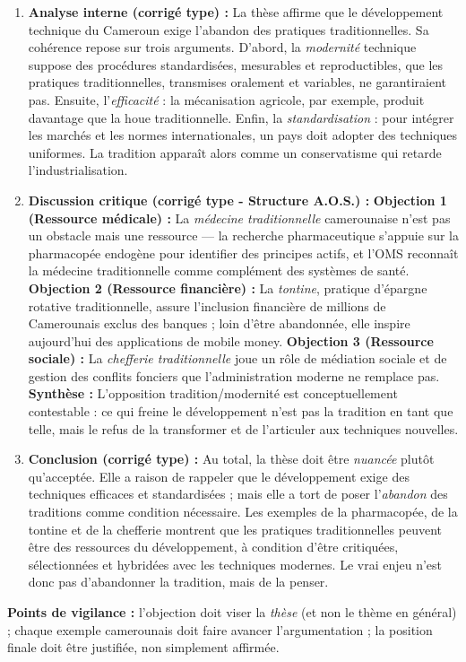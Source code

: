 \documentclass[11pt]{article}
\begin{document}
\begin{exoresolu}[Exercice 8 — Construire une discussion critique — Cas camerounais (Thèse : \og Développement technique = abandon traditions \fg)]
\begin{enumerate}
\item \textbf{Analyse interne (corrigé type) :} La thèse affirme que le développement technique du Cameroun exige l'abandon des pratiques traditionnelles. Sa cohérence repose sur trois arguments. D'abord, la \emph{modernité} technique suppose des procédures standardisées, mesurables et reproductibles, que les pratiques traditionnelles, transmises oralement et variables, ne garantiraient pas. Ensuite, l'\emph{efficacité} : la mécanisation agricole, par exemple, produit davantage que la houe traditionnelle. Enfin, la \emph{standardisation} : pour intégrer les marchés et les normes internationales, un pays doit adopter des techniques uniformes. La tradition apparaît alors comme un conservatisme qui retarde l'industrialisation.
\item \textbf{Discussion critique (corrigé type - Structure A.O.S.) :}
\textbf{Objection 1 (Ressource médicale) :} La \emph{médecine traditionnelle} camerounaise n'est pas un obstacle mais une ressource — la recherche pharmaceutique s'appuie sur la pharmacopée endogène pour identifier des principes actifs, et l'OMS reconnaît la médecine traditionnelle comme complément des systèmes de santé.
\textbf{Objection 2 (Ressource financière) :} La \emph{tontine}, pratique d'épargne rotative traditionnelle, assure l'inclusion financière de millions de Camerounais exclus des banques ; loin d'être abandonnée, elle inspire aujourd'hui des applications de mobile money.
\textbf{Objection 3 (Ressource sociale) :} La \emph{chefferie traditionnelle} joue un rôle de médiation sociale et de gestion des conflits fonciers que l'administration moderne ne remplace pas.
\textbf{Synthèse :} L'opposition tradition/modernité est conceptuellement contestable : ce qui freine le développement n'est pas la tradition en tant que telle, mais le refus de la transformer et de l'articuler aux techniques nouvelles.
\item \textbf{Conclusion (corrigé type) :} Au total, la thèse doit être \emph{nuancée} plutôt qu'acceptée. Elle a raison de rappeler que le développement exige des techniques efficaces et standardisées ; mais elle a tort de poser l'\emph{abandon} des traditions comme condition nécessaire. Les exemples de la pharmacopée, de la tontine et de la chefferie montrent que les pratiques traditionnelles peuvent être des ressources du développement, à condition d'être critiquées, sélectionnées et hybridées avec les techniques modernes. Le vrai enjeu n'est donc pas d'abandonner la tradition, mais de la penser.
\end{enumerate}
\textbf{Points de vigilance :} l'objection doit viser la \emph{thèse} (et non le thème en général) ; chaque exemple camerounais doit faire avancer l'argumentation ; la position finale doit être justifiée, non simplement affirmée.
\end{exoresolu}
\end{document}

